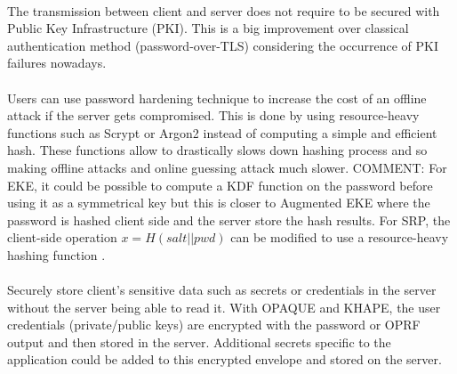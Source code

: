 ﻿\documentclass[../report.tex]{subfiles}
\begin{document}
\paragraph{} %
The transmission between client and server does not require to be secured with Public Key Infrastructure (PKI). This is a big improvement over classical authentication method (password-over-TLS) considering the occurrence of PKI failures nowadays. %
\paragraph{} \label{sec:password_hardening_comparison}
Users can use password hardening technique to increase the cost of an offline attack if the server gets compromised. This is done by using resource-heavy functions such as Scrypt \cite{Scrypt_Paper} or Argon2 \cite{Argon2_Paper} instead of computing a simple and efficient hash. These functions allow to drastically slows down hashing process and so making offline attacks and online guessing attack much slower.
COMMENT: For EKE, it could be possible to compute a KDF function on the password before using it as a symmetrical key but this is closer to Augmented EKE \cite{AEKE_Paper} where the password is hashed client side and the server store the hash results.
For SRP, the client-side operation $x = H(salt||pwd)$ can be modified to use a resource-heavy hashing function \cite{SRP_1Password_blog}.
\paragraph{}
Securely store client's sensitive data such as secrets or credentials in the server without the server being able to read it. With OPAQUE and KHAPE, the user credentials (private/public keys) are encrypted with the password or OPRF output and then stored in the server. Additional secrets specific to the application could be added to this encrypted envelope and stored on the server.
\end{document}
